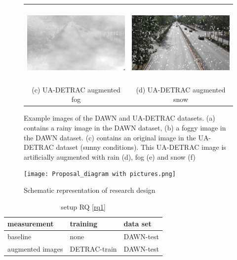 \documentclass[]{article}
\begin{document}
\begin{figure}
\begin{tabular}{cc}
      \includegraphics[width=65mm, height=40mm]{detrac-fog-fullres.png} &   \includegraphics[width=65mm, height=40mm]{detrac-snow-fullres.png} \\
      (c) UA-DETRAC augmented fog & (d) UA-DETRAC augmented snow \\[6pt]
    \end{tabular}
    \caption{Example images of the DAWN and UA-DETRAC datasets.  (a) contains a rainy image in the DAWN dataset, (b) a foggy image in the DAWN dataset.  (c) contains an original image in the UA-DETRAC dataset (sunny conditions).  This UA-DETRAC image is artificially augmented with rain (d), fog (e) and snow (f)  }
    \label{fig:example-images}
  \end{figure}

	\begin{figure}[H]
		\centering
		\texttt{[image: Proposal\_diagram with pictures.png]}
		\caption{Schematic representation of research design}
		\label{fig:experiment_process}
	\end{figure}
	

	\begin{table}[H]
		\centering
		\begin{tabular}{lll}
			\toprule
			\textbf{measurement} & \textbf{training} & \textbf{data set} \\
			\midrule
			baseline & none & DAWN-test \\
			augmented images & DETRAC-train & DAWN-test \\
			\bottomrule
		\end{tabular}
		\caption{setup RQ \ref{rq1}}
		\label{table:setuprq1}
	\end{table}
\end{document}
